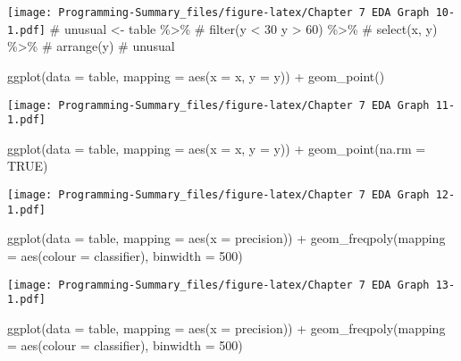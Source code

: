 \documentclass[
]{article}
\newenvironment{Shaded}{\begin{snugshade}}{\end{snugshade}}
\newcommand{\AttributeTok}[1]{\textcolor[rgb]{0.77,0.63,0.00}{#1}}
\newcommand{\ConstantTok}[1]{\textcolor[rgb]{0.00,0.00,0.00}{#1}}
\newcommand{\DecValTok}[1]{\textcolor[rgb]{0.00,0.00,0.81}{#1}}
\newcommand{\FunctionTok}[1]{\textcolor[rgb]{0.00,0.00,0.00}{#1}}
\newcommand{\NormalTok}[1]{#1}
\newcommand{\SpecialCharTok}[1]{\textcolor[rgb]{0.00,0.00,0.00}{#1}}
\begin{document}
\texttt{[image: Programming-Summary\_files/figure-latex/Chapter 7 EDA Graph 10-1.pdf]}
\# unusual \textless- table \%\textgreater\% \# filter(y \textless{} 30
\textbar{} y \textgreater{} 60) \%\textgreater\% \# select(x, y)
\%\textgreater\% \# arrange(y) \# unusual

\begin{Shaded}
\begin{Highlighting}[]
\FunctionTok{ggplot}\NormalTok{(}\AttributeTok{data =}\NormalTok{ table, }\AttributeTok{mapping =} \FunctionTok{aes}\NormalTok{(}\AttributeTok{x =}\NormalTok{ x, }\AttributeTok{y =}\NormalTok{ y)) }\SpecialCharTok{+} 
  \FunctionTok{geom\_point}\NormalTok{()}
\end{Highlighting}
\end{Shaded}

\texttt{[image: Programming-Summary\_files/figure-latex/Chapter 7 EDA Graph 11-1.pdf]}

\begin{Shaded}
\begin{Highlighting}[]
\FunctionTok{ggplot}\NormalTok{(}\AttributeTok{data =}\NormalTok{ table, }\AttributeTok{mapping =} \FunctionTok{aes}\NormalTok{(}\AttributeTok{x =}\NormalTok{ x, }\AttributeTok{y =}\NormalTok{ y)) }\SpecialCharTok{+} 
  \FunctionTok{geom\_point}\NormalTok{(}\AttributeTok{na.rm =} \ConstantTok{TRUE}\NormalTok{)}
\end{Highlighting}
\end{Shaded}

\texttt{[image: Programming-Summary\_files/figure-latex/Chapter 7 EDA Graph 12-1.pdf]}

\begin{Shaded}
\begin{Highlighting}[]
\FunctionTok{ggplot}\NormalTok{(}\AttributeTok{data =}\NormalTok{ table, }\AttributeTok{mapping =} \FunctionTok{aes}\NormalTok{(}\AttributeTok{x =}\NormalTok{ precision)) }\SpecialCharTok{+} 
  \FunctionTok{geom\_freqpoly}\NormalTok{(}\AttributeTok{mapping =} \FunctionTok{aes}\NormalTok{(}\AttributeTok{colour =}\NormalTok{ classifier), }\AttributeTok{binwidth =} \DecValTok{500}\NormalTok{)}
\end{Highlighting}
\end{Shaded}

\texttt{[image: Programming-Summary\_files/figure-latex/Chapter 7 EDA Graph 13-1.pdf]}

\begin{Shaded}
\begin{Highlighting}[]
\FunctionTok{ggplot}\NormalTok{(}\AttributeTok{data =}\NormalTok{ table, }\AttributeTok{mapping =} \FunctionTok{aes}\NormalTok{(}\AttributeTok{x =}\NormalTok{ precision)) }\SpecialCharTok{+} 
  \FunctionTok{geom\_freqpoly}\NormalTok{(}\AttributeTok{mapping =} \FunctionTok{aes}\NormalTok{(}\AttributeTok{colour =}\NormalTok{ classifier), }\AttributeTok{binwidth =} \DecValTok{500}\NormalTok{)}
\end{Highlighting}
\end{Shaded}
\end{document}
